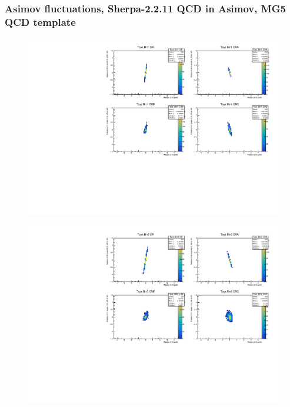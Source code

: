 \subsubsection{\mjj Asimov fluctuations, Sherpa-2.2.11 QCD in Asimov, MG5 QCD template}
\begin{figure}[H]
\includegraphics[width=\textwidth]{plots/diffx/instab/linearfx/instabilities_mjj_QCD_Mgraph_Signal_Sh2211_BSDATASTATS_linearfx_newbinning_sherpaasimov_bin1.pdf}
\end{figure}
\begin{figure}[H]
\includegraphics[width=\textwidth]{plots/diffx/instab/linearfx/instabilities_mjj_QCD_Mgraph_Signal_Sh2211_BSDATASTATS_linearfx_newbinning_sherpaasimov_bin2.pdf}
\end{figure}
